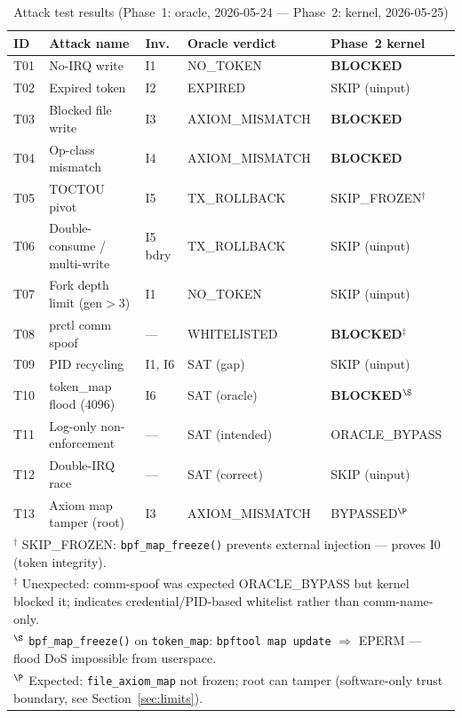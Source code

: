 \documentclass[11pt,a4paper]{article}
\theoremstyle{definition}
\begin{document}
\begin{table}[h]
\centering
\caption{Attack test results (Phase~1: oracle, 2026-05-24 — Phase~2: kernel, 2026-05-25)}
\label{tab:attack-results}
\small
\begin{tabular}{lllll}
\toprule
ID & Attack name & Inv. & Oracle verdict & Phase~2 kernel \\
\midrule
T01 & No-IRQ write               & I1       & NO\_TOKEN        & \textbf{BLOCKED} \\
T02 & Expired token              & I2       & EXPIRED          & SKIP (uinput) \\
T03 & Blocked file write         & I3       & AXIOM\_MISMATCH  & \textbf{BLOCKED} \\
T04 & Op-class mismatch          & I4       & AXIOM\_MISMATCH  & \textbf{BLOCKED} \\
T05 & TOCTOU pivot               & I5       & TX\_ROLLBACK     & SKIP\_FROZEN$^{\dagger}$ \\
T06 & Double-consume / multi-write & I5 bdry & TX\_ROLLBACK    & SKIP (uinput) \\
T07 & Fork depth limit (gen$>$3) & I1       & NO\_TOKEN        & SKIP (uinput) \\
T08 & prctl comm spoof           & —        & WHITELISTED      & \textbf{BLOCKED}$^{\ddagger}$ \\
T09 & PID recycling              & I1, I6   & SAT (gap)        & SKIP (uinput) \\
T10 & token\_map flood (4096)    & I6       & SAT (oracle)     & \textbf{BLOCKED}$^{\S}$ \\
T11 & Log-only non-enforcement   & —        & SAT (intended)   & ORACLE\_BYPASS \\
T12 & Double-IRQ race            & —        & SAT (correct)    & SKIP (uinput) \\
T13 & Axiom map tamper (root)    & I3       & AXIOM\_MISMATCH  & BYPASSED$^{\P}$ \\
\bottomrule
\multicolumn{5}{l}{\parbox{0.93\linewidth}{\footnotesize $^{\dagger}$ SKIP\_FROZEN: \texttt{bpf\_map\_freeze()} prevents external injection — proves I0 (token integrity).}} \\[3pt]
\multicolumn{5}{l}{\parbox{0.93\linewidth}{\footnotesize $^{\ddagger}$ Unexpected: comm-spoof was expected ORACLE\_BYPASS but kernel blocked it; indicates credential/PID-based whitelist rather than comm-name-only.}} \\[3pt]
\multicolumn{5}{l}{\parbox{0.93\linewidth}{\footnotesize $^{\S}$ \texttt{bpf\_map\_freeze()} on \texttt{token\_map}: \texttt{bpftool map update} $\Rightarrow$ EPERM — flood DoS impossible from userspace.}} \\[3pt]
\multicolumn{5}{l}{\parbox{0.93\linewidth}{\footnotesize $^{\P}$ Expected: \texttt{file\_axiom\_map} not frozen; root can tamper (software-only trust boundary, see Section~\ref{sec:limits}).}} \\
\end{tabular}
\end{table}
\end{document}
